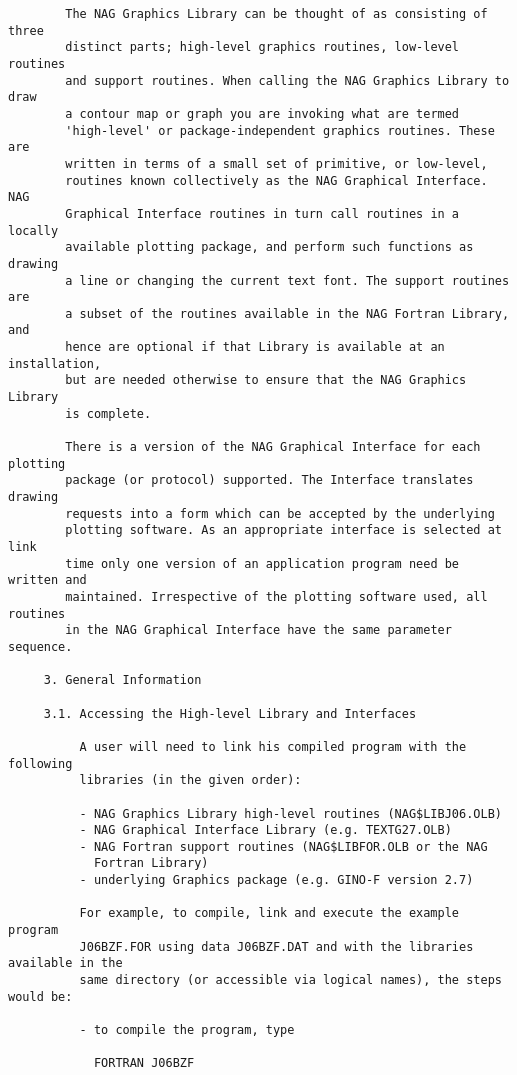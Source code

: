 \begin{verbatim}
        The NAG Graphics Library can be thought of as consisting of three
        distinct parts; high-level graphics routines, low-level routines
        and support routines. When calling the NAG Graphics Library to draw
        a contour map or graph you are invoking what are termed
        'high-level' or package-independent graphics routines. These are
        written in terms of a small set of primitive, or low-level,
        routines known collectively as the NAG Graphical Interface. NAG
        Graphical Interface routines in turn call routines in a locally
        available plotting package, and perform such functions as drawing
        a line or changing the current text font. The support routines are
        a subset of the routines available in the NAG Fortran Library, and
        hence are optional if that Library is available at an installation,
        but are needed otherwise to ensure that the NAG Graphics Library
        is complete.

        There is a version of the NAG Graphical Interface for each plotting
        package (or protocol) supported. The Interface translates drawing
        requests into a form which can be accepted by the underlying
        plotting software. As an appropriate interface is selected at link
        time only one version of an application program need be written and
        maintained. Irrespective of the plotting software used, all routines
        in the NAG Graphical Interface have the same parameter sequence.

     3. General Information

     3.1. Accessing the High-level Library and Interfaces

          A user will need to link his compiled program with the following
          libraries (in the given order):

          - NAG Graphics Library high-level routines (NAG$LIBJ06.OLB)
          - NAG Graphical Interface Library (e.g. TEXTG27.OLB)
          - NAG Fortran support routines (NAG$LIBFOR.OLB or the NAG
            Fortran Library)
          - underlying Graphics package (e.g. GINO-F version 2.7)

          For example, to compile, link and execute the example program
          J06BZF.FOR using data J06BZF.DAT and with the libraries available in the
          same directory (or accessible via logical names), the steps would be:

          - to compile the program, type

            FORTRAN J06BZF


\end{verbatim}
